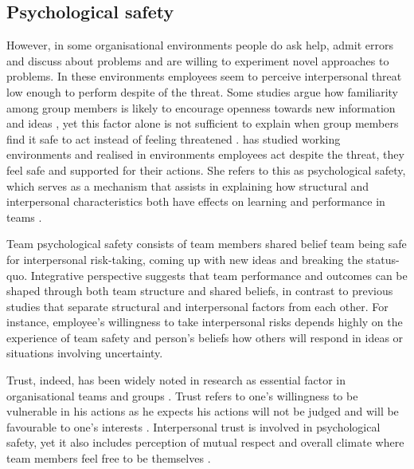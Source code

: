 \subsection{Psychological safety}
However, in some organisational environments people do ask help, admit errors and discuss about problems and are willing to experiment novel approaches to problems. In these environments employees seem to perceive interpersonal threat low enough to perform despite of the threat. Some studies argue how familiarity among group members is likely to encourage openness towards new information and ideas \citep{sanna1990valence}, yet this factor alone is not sufficient to explain when group members find it safe to act instead of feeling threatened \citep{edmondson1999psychological}. \citet{edmondson1999psychological} has studied working environments and realised in environments employees act despite the threat, they feel safe and supported for their actions. She refers to this as psychological safety, which serves as a mechanism that assists in explaining how structural and interpersonal characteristics both have effects on learning and performance in teams \citep{edmondson1999psychological}.  

Team psychological safety consists of team members shared belief team being safe for interpersonal risk-taking, coming up with new ideas and breaking the status-quo. Integrative perspective suggests that team performance and outcomes can be shaped through both team structure and shared beliefs, in contrast to previous studies that separate structural and interpersonal factors from each other. For instance, employee's willingness to take interpersonal risks depends highly on the experience of team safety and person's beliefs how others will respond in ideas or situations involving uncertainty. \citep{edmondson1999psychological}

Trust, indeed, has been widely noted in research as essential factor in organisational teams and groups \citep{golembiewski1975centrality,kramer1999trust,shalley2004leaders,edmondson1999psychological}. Trust refers to one's willingness to be vulnerable in his actions as he expects his actions will not be judged and will be favourable to one's interests \citep{robinson1997corporate}. Interpersonal trust is involved in psychological safety, yet it also includes perception of mutual respect and overall climate where team members feel free to be themselves \citep{edmondson1999psychological}. 

